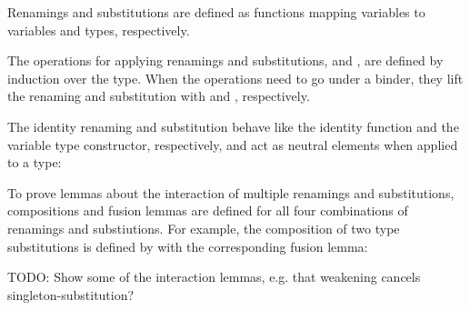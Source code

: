 \documentclass[acmsmall,anonymous,review,screen]{acmart}
\begin{document}
Renamings {\ATRen} and substitutions {\ATSub} are defined as
functions mapping variables to variables and types, respectively.

\noindent\hspace{-\fboxsep}
\begin{minipage}{0.5\linewidth}
  \SubDefTRen
\end{minipage}
\begin{minipage}{0.5\linewidth}
  \SubDefTSub
\end{minipage}

The operations for applying renamings and substitutions, {\ATren}
and {\ATsub}, are defined by induction over the type. When the
operations need to go under a binder, they lift the renaming and
substitution with {\ATliftR} and {\ATliftS}, respectively.

\noindent\hspace{-\fboxsep}
\begin{minipage}{0.5\linewidth}
  \SubDefTren
\end{minipage}
\begin{minipage}{0.5\linewidth}
  \SubDefTsub
\end{minipage}

The identity renaming {\ATidR} and substitution
{\ATidS} behave like the identity function and the variable
type constructor, respectively, and act as neutral elements when applied to a type:

\noindent\hspace{-\fboxsep}
\begin{minipage}{0.5\linewidth}
  \SubDefTidR
  \TFTidRNeutral
\end{minipage}
\begin{minipage}{0.5\linewidth}
  \SubDefTidS
  \TFTidSNeutral
\end{minipage}


To prove lemmas about the interaction of multiple renamings and substitutions,
compositions and fusion lemmas are defined for all four combinations
of renamings and substiutions.
For example, the composition of two type substitutions is defined by
\SubstExamplesTCompSS
with the corresponding fusion lemma:
\SubstExamplesFusionTSubTSub

TODO: Show some of the interaction lemmas, e.g. that weakening cancels singleton-substitution?

\end{document}
